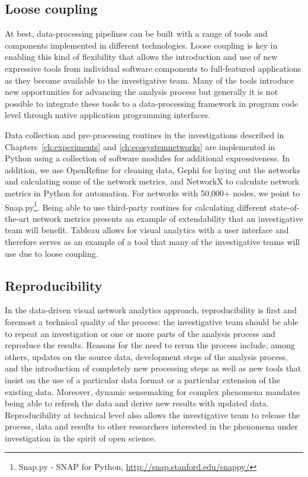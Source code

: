 \subsection{Loose coupling} 

At best, data-processing pipelines can be built with a range of tools and components implemented in different technologies. Loose coupling is key in enabling this kind of flexibility that allows the introduction and use of new expressive tools from individual software components to full-featured applications as they become available to the investigative team. Many of the tools introduce new opportunities for advancing the analysis process but generally it is not possible to integrate these tools to a data-processing framework in program code level through native application programming interfaces.

Data collection and pre-processing routines in the investigations described in Chapters~\ref{ch:experiments} and \ref{ch:ecosystemnetworks} are implemented in Python using a collection of software modules for additional expressiveness. In addition, we use OpenRefine for cleaning data, Gephi for laying out the networks and calculating some of the network metrics, and NetworkX to calculate network metrics in Python for automation. For networks with 50,000+ nodes, we point to Snap.py\footnote{Snap.py - SNAP for Python, \url{http://snap.stanford.edu/snappy/}}. Being able to use third-party routines for calculating different state-of-the-art network metrics presents an example of extendability that an investigative team will benefit. Tableau allows for visual analytics with a user interface and therefore serves as an example of a tool that many of the investigative teams will use due to loose coupling. 

\subsection{Reproducibility}

In the data-driven visual network analytics approach, reproducibility is first and foremost a technical quality of the process: the investigative team should be able to repeat an investigation or one or more parts of the analysis process and reproduce the results. Reasons for the need to rerun the process include, among others, updates on the source data, development steps of the analysis process, and the introduction of completely new processing steps as well as new tools that insist on the use of a particular data format or a particular extension of the existing data. Moreover, dynamic sensemaking for complex phenomena mandates being able to refresh the data and derive new results with updated data. Reproducibility at technical level also allows the investigative team to release the process, data and results to other researchers interested in the phenomena under investigation in the spirit of open science.


